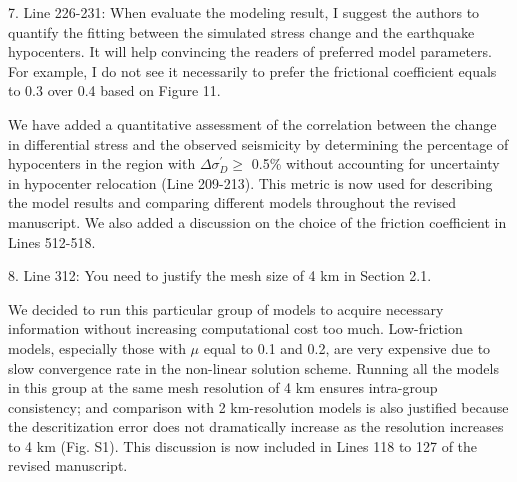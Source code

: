 \documentclass[12pt]{article}
\begin{document}
\begin{response}{7. Line 226-231: When evaluate the modeling result, I suggest the authors to quantify the fitting between the simulated stress change and the earthquake hypocenters. It will help convincing the readers of preferred model parameters. For example, I do not see it necessarily to prefer the frictional coefficient equals to 0.3 over 0.4 based on Figure 11.}

   We have added a quantitative assessment of the correlation between the change in differential stress and the observed seismicity by determining the percentage of hypocenters in the region with $\Delta\sigma_{D}^\prime \ge$ 0.5\% without accounting for uncertainty in hypocenter relocation (Line 209-213). This metric is now used for describing the model results and comparing different models throughout the revised manuscript. We also added a discussion on the choice of the friction coefficient in Lines 512-518.
\end{response}

\begin{response}{8. Line 312: You need to justify the mesh size of 4 km in Section 2.1.}

We decided to run this particular group of models to acquire necessary information without increasing computational cost too much. Low-friction models, especially those with $\mu$ equal to 0.1 and 0.2, are very expensive 
due to slow convergence rate in the non-linear solution scheme. Running all the models in this group at the same mesh resolution of 4 km ensures intra-group consistency; and comparison with 2 km-resolution models is also justified because the descritization error does not dramatically increase as the resolution increases to 4 km (Fig. S1). This discussion is now included in Lines 118 to 127 of the revised manuscript. %
\end{response}
\end{document}
